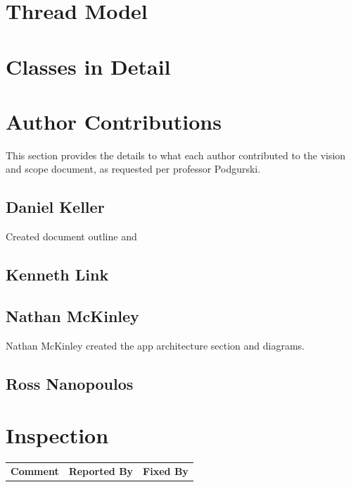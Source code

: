 \documentclass[letter]{scrartcl}
\begin{document}
\section{Thread Model}

\section{Classes in Detail}

\pagebreak
\section{Author Contributions}
This section provides the details to what each author contributed to the vision and scope document, as requested per professor Podgurski.
\subsection{Daniel Keller}
Created document outline and 
\subsection{Kenneth Link}

\subsection{Nathan McKinley}
Nathan McKinley created the app architecture section and diagrams.
\subsection{Ross Nanopoulos}


\section{Inspection}
\begin{tabularx}{\textwidth}{X c c}
\textbf{Comment} & \textbf{Reported By} & \textbf{Fixed By} \\
\end{tabularx}
\end{document}
